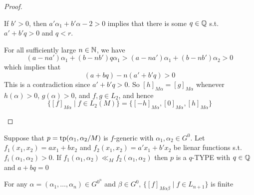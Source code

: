 \documentclass[11pt]{article}
\begin{document}
\begin{proof}
\begin{itemize}
If \(b'>0\), then \(a'\alpha_1+b'\alpha-2>0\) implies that there is some \(q\in\mathbb{Q}\)
s.t. \(a'+b'q>0\) and \(q<r\).

For all sufficiently large \(n\in\mathbb{N}\), we have
\begin{equation*}
(a-na')\alpha_1+(b-nb')q\alpha_1>(a-na')\alpha_1+(b-nb')\alpha_2>0
\end{equation*}
which implies that
\begin{equation*}
(a+bq)-n(a'+b'q)>0
\end{equation*}
This is a contradiction since \(a'+b'q>0\). So \([h]_{M\alpha}=[g]_{M\alpha}\)
whenever \(h(\alpha)>0\), \(g(\alpha)>0\), and \(f,g\in L_2\), and hence
\begin{equation*}
\{[f]_{M\alpha}\mid f\in L_2(M)\}=\{[-h]_{M\alpha},[0]_{M\alpha},[h]_{M\alpha}\}
\end{equation*}
\end{itemize}
\end{proof}

\begin{corollary}[]
Suppose that \(p=\operatorname{tp}(\alpha_1,\alpha_2/M)\) is \(f\)-generic with \(\alpha_1,\alpha_2\in G^0\).
Let \(f_1(x_1,x_2)=ax_1+bx_2\) and \(f_2(x_1,x_2)=a'x_1+b'x_2\) be lienar functions
s.t. \(f_i(\alpha_1,\alpha_2)>0\). If \(f_1(\alpha_1,\alpha_2)\ll_Mf_2(\alpha_1,\alpha_2)\)
then \(p\) is a \(q\)-TYPE with \(q\in\mathbb{Q}\) and \(a+bq=0\)
\end{corollary}

\begin{lemma}[]
For any \(\alpha=(\alpha_1,\dots,\alpha_n)\in G^{0^n}\)
and \(\beta\in G^0\), \(\{[f]_{M\alpha\beta}\mid f\in L_{n+1}\}\) is finite
\end{lemma}
\end{document}

